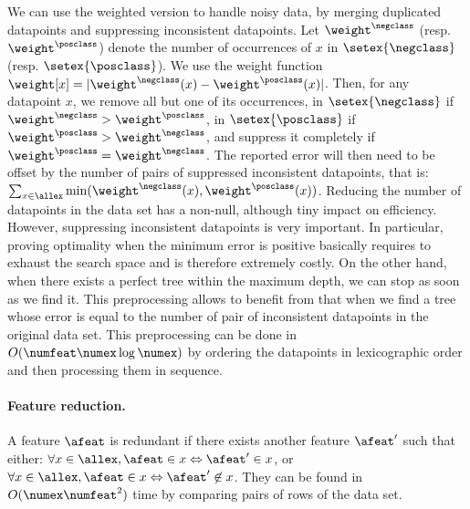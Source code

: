 \documentclass{article}
\begin{document}
We can use the weighted version to handle noisy data, by merging duplicated datapoints and suppressing inconsistent datapoints.
%
Let $\weight^{\negclass}$ (resp. $\weight^{\posclass}$) denote the number of occurrences of $x$ in $\setex{\negclass}$ (resp. $\setex{\posclass}$). We use the weight function $\weight[x] = |\weight^{\negclass}(x) - \weight^{\posclass}(x)|$. Then, for any datapoint $x$, we remove all but one of its occurrences, in $\setex{\negclass}$ if $\weight^{\negclass}>\weight^{\posclass}$, in $\setex{\posclass}$ if $\weight^{\posclass}>\weight^{\negclass}$, and suppress it completely if $\weight^{\posclass}=\weight^{\negclass}$.
The reported error will then need to be offset by the number of pairs of suppressed inconsistent datapoints, that is:
$
\sum_{x \in \allex}\min(\weight^{\negclass}(x), \weight^{\posclass}(x))
$.
Reducing the number of datapoints in the data set has a non-null, although tiny impact on efficiency. However, suppressing inconsistent datapoints is very important. In particular, proving optimality when the minimum error is positive basically requires to exhaust the search space and is therefore extremely costly. On the other hand, when there exists a perfect tree within the maximum depth, we can stop as soon as we find it. This preprocessing allows to benefit from that when we find a tree whose error is equal to the number of pair of inconsistent datapoints in the original data set.
This preprocessing can be done in $O(\numfeat \numex \log \numex)$ by ordering the datapoints in lexicographic order and then processing them in sequence.

\paragraph{Feature reduction.}

A feature $\afeat$ is redundant if there exists another feature $\afeat'$ such that either: $\forall x \in \allex, \afeat \in x \Leftrightarrow \afeat' \in x$, or $\forall x \in \allex, \afeat \in x \Leftrightarrow \afeat' \not\in x$.
They can be found in $O(\numex\numfeat^2)$ time by comparing pairs of rows of the data set.
\end{document}

